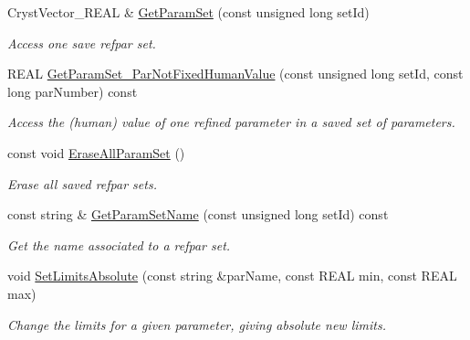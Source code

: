 \begin{DoxyCompactItemize}
Cryst\+Vector\+\_\+\+R\+E\+AL \& \mbox{\hyperlink{class_obj_cryst_1_1_refinable_obj_abbc5f8e9aaf4dcd7dbe96233ad96f5e0}{Get\+Param\+Set}} (const unsigned long set\+Id)
\begin{DoxyCompactList}\small\item\em Access one save refpar set. \end{DoxyCompactList}\item 
\mbox{\label{class_obj_cryst_1_1_refinable_obj_a01481bc768d90b52a38b38060cd8aadf}} 
R\+E\+AL \mbox{\hyperlink{class_obj_cryst_1_1_refinable_obj_a01481bc768d90b52a38b38060cd8aadf}{Get\+Param\+Set\+\_\+\+Par\+Not\+Fixed\+Human\+Value}} (const unsigned long set\+Id, const long par\+Number) const
\begin{DoxyCompactList}\small\item\em Access the (human) value of one refined parameter in a saved set of parameters. \end{DoxyCompactList}\item 
const void \mbox{\hyperlink{class_obj_cryst_1_1_refinable_obj_ac269ad4ad4ca8b4e9f13f5466475d959}{Erase\+All\+Param\+Set}} ()
\begin{DoxyCompactList}\small\item\em Erase all saved refpar sets. \end{DoxyCompactList}\item 
const string \& \mbox{\hyperlink{class_obj_cryst_1_1_refinable_obj_a266c79068ce53c9b5040809004bf3c63}{Get\+Param\+Set\+Name}} (const unsigned long set\+Id) const
\begin{DoxyCompactList}\small\item\em Get the name associated to a refpar set. \end{DoxyCompactList}\item 
\mbox{\label{class_obj_cryst_1_1_refinable_obj_a2f24a7b834f5588e32aac9c6e33a1020}} 
void \mbox{\hyperlink{class_obj_cryst_1_1_refinable_obj_a2f24a7b834f5588e32aac9c6e33a1020}{Set\+Limits\+Absolute}} (const string \&par\+Name, const R\+E\+AL min, const R\+E\+AL max)
\begin{DoxyCompactList}\small\item\em Change the limits for a given parameter, giving absolute new limits. \end{DoxyCompactList}\item 
\mbox{\label{class_obj_cryst_1_1_refinable_obj_a371f137ad14a77ee3b545520d05fe4d6}} 

\end{DoxyCompactItemize}

